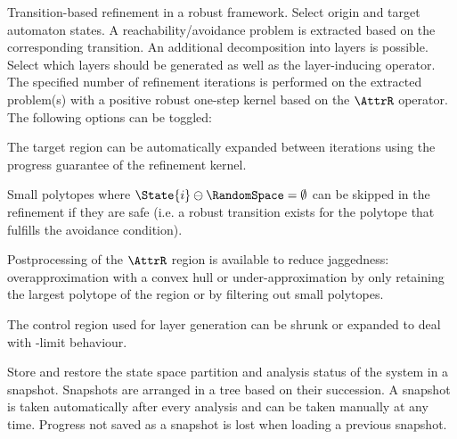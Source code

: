     \stopsubsubject

    \startsubsubject[title={Widget: Robust Transition Refinement}]

        Transition-based refinement in a robust framework.
        Select origin and target automaton states.
        A reachability/avoidance problem is extracted based on the corresponding transition.
        An additional decomposition into layers is possible.
        Select which layers should be generated as well as the layer-inducing operator.
        The specified number of refinement iterations is performed on the extracted problem(s) with a positive robust one-step kernel based on the $\AttrR$ operator.
        The following options can be toggled:

        \startitemize[packed]
            \item{The target region can be automatically expanded between iterations using the progress guarantee of the refinement kernel.}
            \item{Small polytopes where $\State{i} \ominus \RandomSpace = \emptyset$ can be skipped in the refinement if they are safe (i.e. a robust transition exists for the polytope that fulfills the avoidance condition).}
            \item{Postprocessing of the $\AttrR$ region is available to reduce jaggedness: overapproximation with a convex hull or under-approximation by only retaining the largest polytope of the region or by filtering out small polytopes.}
            \item{The control region used for layer generation can be shrunk or expanded to deal with \epsilon-limit behaviour.}
        \stopitemize

    \stopsubsubject

    \startsubsubject[title={Widget: Snapshots}]

        Store and restore the state space partition and analysis status of the system in a snapshot.
        Snapshots are arranged in a tree based on their succession.
        A snapshot is taken automatically after every analysis and can be taken manually at any time.
        Progress not saved as a snapshot is lost when loading a previous snapshot.

    \stopsubsubject

\stopsubject



